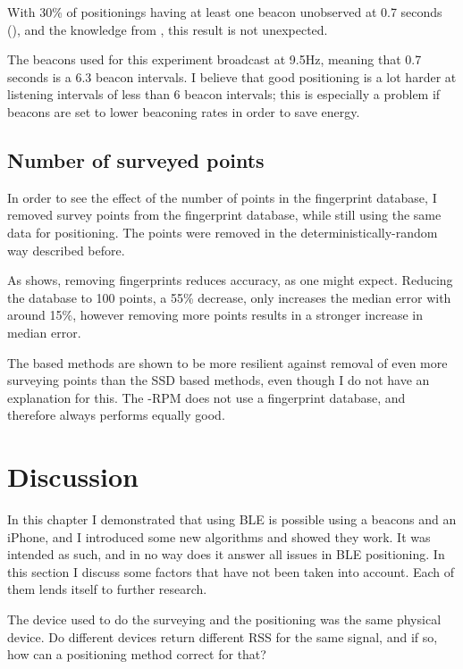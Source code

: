 With 30\% of positionings having at least one beacon unobserved at 0.7 seconds (), and the knowledge from , this result is not unexpected.

The beacons used for this experiment broadcast at 9.5Hz, meaning that 0.7 seconds is a 6.3 beacon intervals.
I believe that good positioning is a lot harder at listening intervals of less than 6 beacon intervals; this is especially a problem if beacons are set to lower beaconing rates in order to save energy.

\subsection{Number of surveyed points}
\label{sec:architecture-number-surveyed-points}
In order to see the effect of the number of points in the fingerprint database, I removed survey points from the fingerprint database, while still using the same data for positioning.
The points were removed in the deterministically-random way described before.

As  shows, removing fingerprints reduces accuracy, as one might expect.
Reducing the database to 100 points, a 55\% decrease, only increases the median error with around 15\%, however removing more points results in a stronger increase in median error.

The \aBRP based methods are shown to be more resilient against removal of even more surveying points than the SSD based methods, even though I do not have an explanation for this.
The \aBRP-RPM does not use a fingerprint database, and therefore always performs equally good.

\section{Discussion}
\label{sec:architecture-discussion}
In this chapter I demonstrated that \ptfp using BLE is possible using a beacons and an iPhone, and I introduced some new algorithms and showed they work.
It was intended as such, and in no way does it answer all issues in BLE positioning.
In this section I discuss some factors that have not been taken into account.
Each of them lends itself to further research.

The device used to do the surveying and the positioning was the same physical device.
Do different devices return different RSS for the same signal, and if so, how can a positioning method correct for that?

